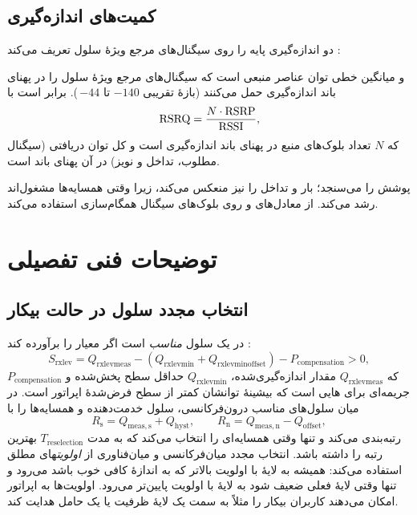 \documentclass[11pt,a4paper]{article}
\begin{document}
\subsection{کمیت‌های اندازه‌گیری}
 دو اندازه‌گیری پایه را روی سیگنال‌های مرجع ویژهٔ سلول تعریف می‌کند \cite{ts36300}:
\begin{definitionbox}{ و }
\emph{} میانگین خطی توان عناصر منبعی است که سیگنال‌های مرجع ویژهٔ سلول را در پهنای
باند اندازه‌گیری حمل می‌کنند (بازهٔ تقریبی $-140$ تا $-44$\,). \emph{} برابر است با
\begin{equation}\label{eq:rsrq}
  \mathrm{RSRQ} = \frac{N\cdot\mathrm{RSRP}}{\mathrm{RSSI}},
\end{equation}
که $N$ تعداد بلوک‌های منبع در پهنای باند اندازه‌گیری  است و  کل توان دریافتی
(سیگنال مطلوب، تداخل و نویز) در آن پهنای باند است.
\end{definitionbox}
 پوشش را می‌سنجد؛  بار و تداخل را نیز منعکس می‌کند، زیرا وقتی همسایه‌ها
مشغول‌اند  رشد می‌کند.  از معادل‌های  و  روی بلوک‌های
سیگنال همگام‌سازی استفاده می‌کند.

\section{توضیحات فنی تفصیلی}

\subsection{انتخاب مجدد سلول در حالت بیکار}
در  یک سلول \emph{مناسب} است اگر معیار  را برآورده کند \cite{ts36304}:
\begin{equation}\label{eq:scrit}
  S_{\mathrm{rxlev}} = Q_{\mathrm{rxlevmeas}} - (Q_{\mathrm{rxlevmin}} + Q_{\mathrm{rxlevminoffset}})
  - P_{\mathrm{compensation}} > 0 ,
\end{equation}
که $Q_{\mathrm{rxlevmeas}}$ مقدار  اندازه‌گیری‌شده، $Q_{\mathrm{rxlevmin}}$ حداقل سطح پخش‌شده و
$P_{\mathrm{compensation}}$ جریمه‌ای برای هایی است که بیشینهٔ توانشان کمتر از سطح فرض‌شدهٔ
اپراتور است.  در میان سلول‌های مناسب درون‌فرکانسی، سلول خدمت‌دهنده و همسایه‌ها را با
\begin{equation}\label{eq:rcrit}
  R_\mathrm{s} = Q_{\mathrm{meas,s}} + Q_{\mathrm{hyst}}, \qquad
  R_\mathrm{n} = Q_{\mathrm{meas,n}} - Q_{\mathrm{offset}},
\end{equation}
رتبه‌بندی می‌کند و تنها وقتی همسایه‌ای را انتخاب می‌کند که به مدت $T_{\mathrm{reselection}}$ بهترین
رتبه را داشته باشد. انتخاب مجدد میان‌فرکانسی و میان‌فناوری از \emph{اولویت}های مطلق استفاده
می‌کند:  همیشه به لایهٔ با اولویت بالاتر که به اندازهٔ کافی خوب باشد می‌رود و تنها وقتی
لایهٔ فعلی ضعیف شود به لایهٔ با اولویت پایین‌تر می‌رود. اولویت‌ها به اپراتور امکان می‌دهند کاربران
بیکار را مثلاً به سمت یک لایهٔ ظرفیت یا یک حامل  هدایت کند.
\end{document}
